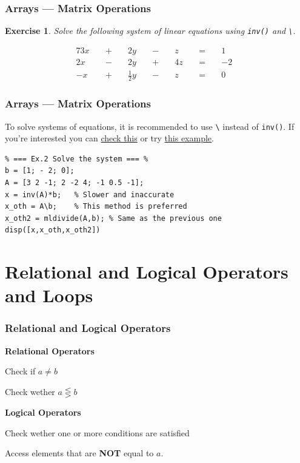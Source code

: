 \documentclass[11pt,xcolor={svgnames},aspectratio=169,usepdftitle=false]{beamer}
\let\toneitemize\itemize
\let\ttwoitemize\enditemize
\renewenvironment{itemize}{\toneitemize\addtolength{\itemsep}{1.35\baselineskip}}{\ttwoitemize}
\newtheorem{exercise}{Exercise}
\begin{document}
\begin{frame}[fragile]
    \frametitle{Arrays --- Matrix Operations}
\begin{exercise} 
Solve the following system of linear equations using \verb;inv(); and \verb;\;.

\begin{alignat*}{7}
3x&& \; + \; &&2y&& \; - \; &&z&& \; = \; &&1&\\
2x&& \; - \; &&2y&& \; + \; &&4z&& \; = \; &&-2&\\
-x&& \; + \; &&{\tfrac {1}{2}}y&& \; - \; &&z&& \; = \; &&0&
\end{alignat*}
\end{exercise}
\end{frame}

\begin{frame}[fragile]
    \frametitle{Arrays --- Matrix Operations}
To solve systems of equations, it is recommended to use \verb;\; instead of \verb;inv();. If you're interested you can \href{https://www.mathworks.com/matlabcentral/answers/139778-what-is-the-difference-between-inv-and-the-backslash#answer_143286}{check this} or try \href{https://www.mathworks.com/help/matlab/ref/inv.html#bu6sfy8-1}{this example}.
\begin{lstlisting}
% === Ex.2 Solve the system === %
b = [1; - 2; 0];
A = [3 2 -1; 2 -2 4; -1 0.5 -1];
x = inv(A)*b;   % Slower and inaccurate
x_oth = A\b;    % This method is preferred
x_oth2 = mldivide(A,b); % Same as the previous one
disp([x,x_oth,x_oth2])
\end{lstlisting}
\end{frame}

\section{Relational and Logical Operators and Loops}

\begin{frame}
    \frametitle{Relational and Logical Operators}
    \alert{\textbf{Relational Operators}}
\begin{itemize}
    \item Check if $a\neq b$
    \item Check wether $a \lesseqgtr b$
\end{itemize}

\alert{\textbf{Logical Operators}}
\begin{itemize}
    \item Check wether one or more conditions are satisfied
    \item Access elements that are \textbf{NOT} equal to $a$.
\end{itemize}
\end{frame}
\end{document}
